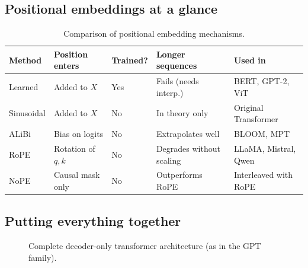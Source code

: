 \documentclass[11pt,a4paper]{article}
\DeclareMathOperator{\softmax}{softmax}
\newcommand{\slides}[1]{\par\nopagebreak\noindent{\normalfont\small\emph{(slides #1)}}\par\nopagebreak\vspace{2pt}}
\theoremstyle{definition}
\theoremstyle{plain}
\begin{document}
\subsection{Positional embeddings at a glance}\slides{60 / 84}
\begin{table}[H]
\centering\small
\renewcommand{\arraystretch}{1.2}
\begin{tabular}{@{}lllll@{}}
\toprule
\textbf{Method} & \textbf{Position enters} & \textbf{Trained?} & \textbf{Longer sequences} & \textbf{Used in} \\
\midrule
Learned & Added to $X$ & Yes & Fails (needs interp.) & BERT, GPT-2, ViT \\
Sinusoidal & Added to $X$ & No & In theory only & Original Transformer \\
ALiBi & Bias on logits & No & Extrapolates well & BLOOM, MPT \\
RoPE & Rotation of $q, k$ & No & Degrades without scaling & LLaMA, Mistral, Qwen \\
NoPE & Causal mask only & No & Outperforms RoPE & Interleaved with RoPE \\
\bottomrule
\end{tabular}
\caption{Comparison of positional embedding mechanisms.}\label{tab:pe_summary}
\end{table}

\subsection{Putting everything together}\slides{61 / 84}
\begin{figure}[H]
\centering
{}
\caption{Complete decoder-only transformer architecture (as in the GPT family).}\label{fig:decoder_pipeline}
\end{figure}
\end{document}
